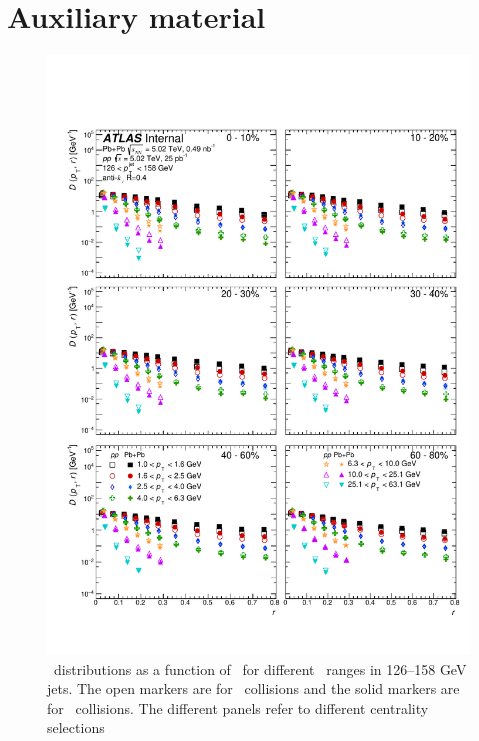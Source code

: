 
\part*{Auxiliary material}



\begin{figure}[h]
\includegraphics[width=1.0\textwidth]{figures/results/DpT_dR_jet7}
\caption{ \Dptr\ distributions as a function of \rvar\ for different \pt\ ranges in 126--158 GeV jets. The open markers are for \pp\ collisions and the solid markers are for \pbpb\ collisions. The different panels refer to different centrality selections}
\label{fig:fullset_dptr_j7}
\end{figure}

